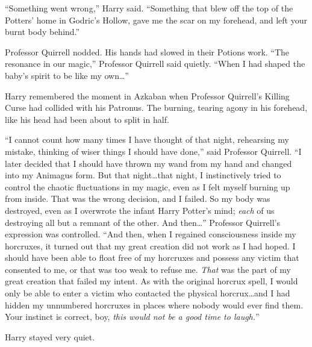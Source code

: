 “Something went wrong,” Harry said. “Something that blew off the top of the Potters’ home in Godric’s Hollow, gave me the scar on my forehead, and left your burnt body behind.”

Professor Quirrell nodded. His hands had slowed in their Potions work. “The resonance in our magic,” Professor Quirrell said quietly. “When I had shaped the baby’s spirit to be like my own…”

Harry remembered the moment in Azkaban when Professor Quirrell’s Killing Curse had collided with his Patronus. The burning, tearing agony in his forehead, like his head had been about to split in half.

“I cannot count how many times I have thought of that night, rehearsing my mistake, thinking of wiser things I should have done,” said Professor Quirrell. “I later decided that I should have thrown my wand from my hand and changed into my Animagus form. But that night…that night, I instinctively tried to control the chaotic fluctuations in my magic, even as I felt myself burning up from inside. That was the wrong decision, and I failed. So my body was destroyed, even as I overwrote the infant Harry Potter’s mind; \emph{each} of us destroying all but a remnant of the other. And then…” Professor Quirrell’s expression was controlled. “And then, when I regained consciousness inside my horcruxes, it turned out that my great creation did not work as I had hoped. I should have been able to float free of my horcruxes and possess any victim that consented to me, or that was too weak to refuse me. \emph{That} was the part of my great creation that failed my intent. As with the original horcrux spell, I would only be able to enter a victim who contacted the physical horcrux…and I had hidden my unnumbered horcruxes in places where nobody would ever find them. Your instinct is correct, boy, \emph{this would not be a good time to laugh.}”

Harry stayed very quiet.

